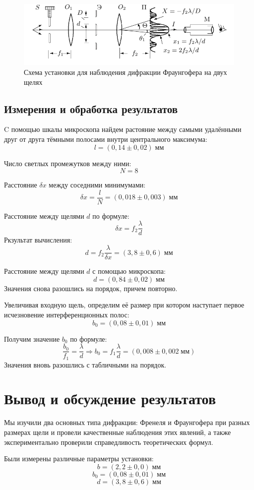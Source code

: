 \documentclass[a4paper,12pt]{article} %
\begin{document}
\begin{figure}[h!]
  \centering
  \includegraphics[width=0.8\linewidth]{g.png}
  \caption{Схема установки для наблюдения дифракции Фраунгофера на двух щелях}
  \label{labC}
\end{figure}

\subsection{Измерения и обработка результатов}

C помощью шкалы микроскопа найдем растояние между самыми удалёнными друг от друга тёмными полосами внутри центрального максимума:
\[ l = (0,14 \pm 0,02)\;мм \]

Число светлых промежутков между ними:
\[ N = 8 \]

Расстояние \(\delta x\) между соседними минимумами:
\[ \delta x = \frac{l}{N} = (0,018\pm 0,003)\; мм \]

Расстояние между щелями \(d\) по формуле:
\[ \delta x = f_2\frac{\lambda}{d} \]
Ркзультат вычисления:
\[ d = f_2\frac{\lambda}{\delta x} = (3,8\pm 0,6)\;мм \]

Расстояние между щелями \(d\) с помощью микроскопа:
\[ d = (0,84\pm 0,02)\;мм \]
Значения снова разошлись на порядок, причем повторно.

Увеличивая входную щель, определим её размер при котором наступает первое исчезновение интерференционных полос:
\[ b_0 = (0,08\pm 0,01)\;мм \]

Получим значение \(b_0\) по формуле:
\[ \frac{b_0}{f_1} = \frac{\lambda}{d} \Rightarrow b_0 = f_1\frac{\lambda}{d} = (0,008 \pm 0,002\;мм)\]
Значения вновь разошлись с табличными на порядок.

\section{Вывод и обсуждение результатов}
Мы изучили два основных типа дифракции: Френеля и Фраунгофера при разных размерах щели и провели качественные наблюдения этих явлений, а также экспериментально проверили справедливость теоретических формул.

 Были измерены различные параметры установки:
  \[ b = (2,2 \pm 0,0)\;мм \]
  \[ b_0 = (0,08\pm 0,01)\;мм \]
  \[ d = (3,8\pm 0,6)\;мм \]
\end{document}
